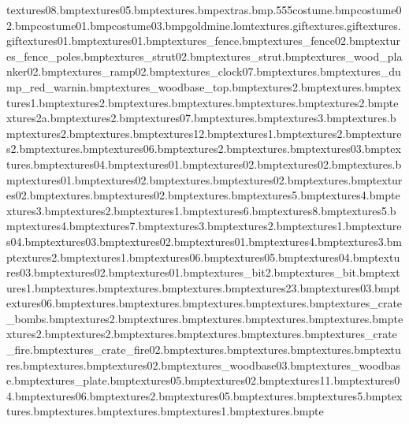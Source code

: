 textures\minerock08.bmp textures\minerock05.bmp textures\gmtowermid.bmp extras\map.bmp.555 costume\indyhatband.bmp costume\indywhip02.bmp costume\indywhip01.bmp costume\indywhip03.bmp goldmine.lom textures\conveyorwheels.gif textures\conveyor.gif textures\goldglint.gif textures\flattenedtazbit01.bmp textures\flattenedtazface01.bmp textures\wood_fence.bmp textures\wood_fence02.bmp textures\wood_fence_poles.bmp textures\wood_strut02.bmp textures\wood_strut.bmp textures\barrier_wood_planker02.bmp textures\wood_ramp02.bmp textures\station_clock07.bmp textures\tnt.bmp textures\ammo_dump_red_warnin.bmp textures\ammodump_woodbase_top.bmp textures\aquapyratesign2.bmp textures\aquaplanks.bmp textures\aquapyratesign1.bmp textures\aquaplanks2.bmp textures\flash.bmp textures\warningline.bmp textures\trucktire.bmp textures\gurder2.bmp textures\gurderend2a.bmp textures\safsignvan2.bmp textures\sign07.bmp textures\safsignele.bmp textures\safsigntree3.bmp textures\safsigntree.bmp textures\safsigntree2.bmp textures\safsignjurassic.bmp textures\sign12.bmp textures\safsign1.bmp textures\safsignmonk2.bmp textures\safsignbana2.bmp textures\woodplank.bmp textures\sign06.bmp textures\safsignshele2.bmp textures\safsignshele.bmp textures\gumballpost03.bmp textures\winsports.bmp textures\machineback04.bmp textures\gumballpost01.bmp textures\gumballpost02.bmp textures\gumballs02.bmp textures\torch.bmp textures\trough01.bmp textures\rocksafari02.bmp textures\rocksafari.bmp textures\rockgrey02.bmp textures\rockgrey.bmp textures\rockbrown02.bmp textures\rockbrown.bmp textures\rockwest02.bmp textures\rockwest.bmp textures\bombbit5.bmp textures\bombbit4.bmp textures\bombbit3.bmp textures\bombbit2.bmp textures\bombbit1.bmp textures\tvbits6.bmp textures\tvbits8.bmp textures\tvbits5.bmp textures\tvbits4.bmp textures\tvbits7.bmp textures\tvbits3.bmp textures\tvbits2.bmp textures\tvbits1.bmp textures\coins04.bmp textures\coins03.bmp textures\coins02.bmp textures\coins01.bmp textures\cash4.bmp textures\cash3.bmp textures\cash2.bmp textures\cash1.bmp textures\splinter06.bmp textures\splinter05.bmp textures\splinter04.bmp textures\splinter03.bmp textures\splinter02.bmp textures\splinter01.bmp textures\cactus_bit2.bmp textures\cactus_bit.bmp textures\metbox1.bmp textures\post.bmp textures\tazwanted.bmp textures\tazwantedposback.bmp textures\sign23.bmp textures\sign03.bmp textures\hubflowers06.bmp textures\hutcane.bmp textures\hutwood.bmp textures\hutwoodlight.bmp textures\pandaface.bmp textures\exp_crate_bombs.bmp textures\cwhat2.bmp textures\cwcup.bmp textures\posttop.bmp textures\hutposts.bmp textures\tea.bmp textures\tea2.bmp textures\flask2.bmp textures\plungerboxacme.bmp textures\plungerbox.bmp textures\plungerbhole.bmp textures\exp_crate_fire.bmp textures\exp_crate_fire02.bmp textures\ceilingtiles.bmp textures\tarporline.bmp textures\plankswood.bmp textures\woodplanks.bmp textures\bearing.bmp textures\bearing02.bmp textures\ammodump_woodbase03.bmp textures\ammodump_woodbase.bmp textures\bearing_plate.bmp textures\wwrock05.bmp textures\wwrock02.bmp textures\wwrock11.bmp textures\wwrock04.bmp textures\wwrock06.bmp textures\gurderend2.bmp textures\spookyrock05.bmp textures\flask.bmp textures\tunrock5.bmp textures\gurdergrey.bmp textures\glass.bmp textures\metbox.bmp textures\locker1.bmp textures\doorgroove.bmp te